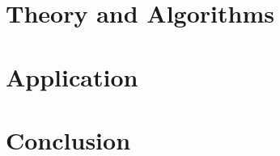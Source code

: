 \documentclass[10pt,oneside]{book}
\begin{document}
    \mainmatter
    \pagestyle{fancy}
    

    

    \part{Theory and Algorithms} \label{part:theory}
    
    

    
    

    
    
    

    \part{Application} \label{part:application}
    
    

    \part{Conclusion}
    

    \appendix
    

    \printbibliography
    
\end{document}

